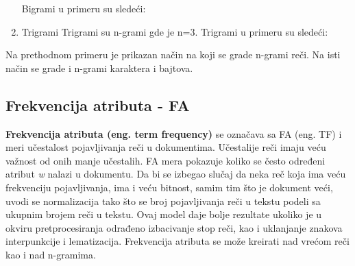 \documentclass[12pt,oneside]{memoir}
\begin{document}
\begin{enumerate}
Bigrami u primeru su sledeći: 
\newline
\newline
\noindent{}
\newline
\newline
\item Trigrami
\newline
Trigrami su n-grami gde je n=3. Trigrami u primeru su sledeći:
\newline
\newline
\noindent{}
\newline
\newline
\end{enumerate}
\noindent
Na prethodnom primeru je prikazan način na koji se grade n-grami reči. Na isti način se grade i n-grami karaktera i bajtova.  
\subsection{Frekvencija atributa - FA}

\textbf{Frekvencija atributa (eng. term frequency)} se označava sa FA (eng. TF) i meri učestalost pojavljivanja reči u dokumentima.  Učestalije reči imaju veću važnost od onih manje učestalih.  FA mera pokazuje koliko se često određeni atribut \textit{w} nalazi u dokumentu. Da bi se izbegao slučaj da neka reč koja ima veću frekvenciju pojavljivanja, ima i veću bitnost, samim tim što je dokument veći, uvodi se normalizacija tako što se broj pojavljivanja reči u tekstu podeli sa ukupnim brojem reči u tekstu.  Ovaj model daje bolje rezultate ukoliko je u okviru pretprocesiranja odrađeno izbacivanje stop reči, kao i uklanjanje znakova interpunkcije i lematizacija.  Frekvencija atributa se može kreirati nad vrećom reči kao i nad n-gramima.
\end{document}
